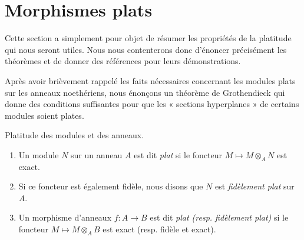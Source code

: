 \section{Morphismes plats}
\label{section-flat-morphisms}

\noindent
Cette section a simplement pour objet de résumer les propriétés de la platitude qui
nous seront utiles. Nous nous contenterons donc d'énoncer précisément les théorèmes
et de donner des références pour leurs démonstrations.

\medskip\noindent
Après avoir brièvement rappelé les faits nécessaires concernant les modules plats sur les anneaux
noethériens, nous énonçons un théorème de Grothendieck qui donne des conditions suffisantes
pour que les « sections hyperplanes » de certains modules soient plates.

\begin{definition}
\label{definition-flat-rings}
Platitude des modules et des anneaux.
\begin{enumerate}
\item Un module $N$ sur un anneau $A$ est dit {\it plat}
si le foncteur $M \mapsto M \otimes_A N$ est exact.
\item Si ce foncteur est également fidèle, nous disons que
$N$ est {\it fidèlement plat} sur $A$.
\item Un morphisme d'anneaux $f : A \to B$ est dit
{\it plat (resp. fidèlement plat)}
si le foncteur $M \mapsto M \otimes_A B$ est exact
(resp. fidèle et exact).
\end{enumerate}
\end{definition}

